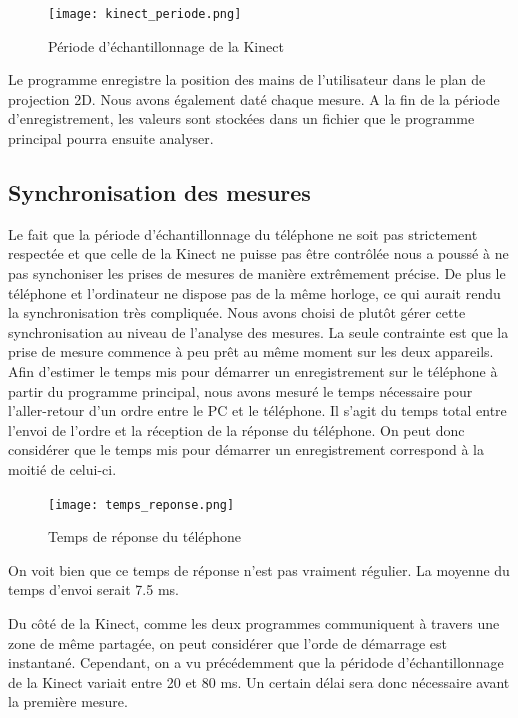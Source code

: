 \documentclass[12pt, french]{article}
\begin{document}
\begin{figure}[H]
\centering
\texttt{[image: kinect\_periode.png]}
\caption{Période d'échantillonnage de la Kinect}
\label{fig4}
\end{figure}

Le programme enregistre la position des mains de l'utilisateur dans le plan de projection 2D. Nous avons également daté chaque mesure. A la fin de la période d'enregistrement, les valeurs sont stockées dans un fichier que le programme principal pourra ensuite analyser.


\subsection{Synchronisation des mesures}

Le fait que la période d'échantillonnage du téléphone ne soit pas strictement respectée et que celle de la Kinect ne puisse pas être contrôlée nous a poussé à ne pas synchoniser les prises de mesures de manière extrêmement précise. De plus le téléphone et l'ordinateur ne dispose pas de la même horloge, ce qui aurait rendu la synchronisation très compliquée. Nous avons choisi de plutôt gérer cette synchronisation au niveau de l'analyse des mesures. La seule contrainte est que la prise de mesure commence à peu prêt au même moment sur les deux appareils. Afin d'estimer le temps mis pour démarrer un enregistrement sur le téléphone à partir du programme principal, nous avons mesuré le temps nécessaire pour l'aller-retour d'un ordre entre le PC et le téléphone. Il s'agit du temps total entre l'envoi de l'ordre et la réception de la réponse du téléphone. On peut donc considérer que le temps mis pour démarrer un enregistrement correspond à la moitié de celui-ci.

\begin{figure}[H]
\centering
\texttt{[image: temps\_reponse.png]}
\caption{Temps de réponse du téléphone}
\label{fig5}
\end{figure}


On voit bien que ce temps de réponse n'est pas vraiment régulier. La moyenne du temps d'envoi serait 7.5 ms.


Du côté de la Kinect, comme les deux programmes communiquent à travers une zone de même partagée, on peut considérer que l'orde de démarrage est instantané. Cependant, on a vu précédemment que la péridode d'échantillonnage de la Kinect variait entre 20 et 80 ms. Un certain délai sera donc nécessaire avant la première mesure.
\end{document}
